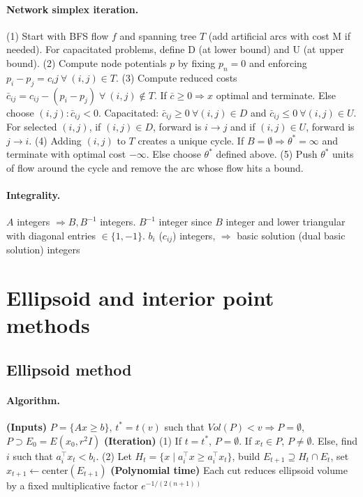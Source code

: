 \documentclass{article}
\begin{document}
\paragraph{Network simplex iteration.}
(1) Start with BFS flow $f$ and spanning tree $T$ (add artificial arcs with cost M if needed). For capacitated problems, define D (at lower bound) and U (at upper bound).
(2) Compute node potentials $p$ by fixing $p_n=0$ and enforcing $p_i - p_j = c_ij\ \forall\ (i,j)\in T$.
(3) Compute reduced costs $\bar c_{ij} = c_{ij} - (p_i - p_j)\;\forall\ (i,j)\notin T$. If $\bar c \geq 0 \Rightarrow x$ optimal and terminate. Else choose $(i,j): \bar c_{ij} < 0$. Capacitated: $\bar c_{ij} \geq 0\ \forall(i,j)\in D$ and $\bar c_{ij} \leq 0\ \forall(i,j)\in U$. For selected $(i,j)$, if $(i,j)\in D$, forward is $i\rightarrow j$ and if $(i,j)\in U$, forward is $j\rightarrow i$.
(4) Adding $(i,j)$ to $T$ creates a unique cycle. If $B=\emptyset\Longrightarrow \theta^*=\infty$ and terminate with optimal cost $-\infty$. Else choose $\theta^*$ defined above.
(5) Push $\theta^*$ units of flow around the cycle and remove the arc whose flow hits a bound.


\paragraph{Integrality.} $A$ integers $\Rightarrow B,B^{-1}$ integers. $B^{-1}$ integer since $B$ integer and lower triangular with diagonal entries $\in\{1, -1\}$. $b_i$ ($c_{ij}$) integers, $\Rightarrow$ basic solution (dual basic solution) integers


\section{Ellipsoid and interior point methods}
\subsection{Ellipsoid method}

\paragraph{Algorithm.} \textbf{(Inputs)} $P=\{Ax \geq b\}$, $t^*=t(v)$ such that $Vol(P) < v \Rightarrow P=\emptyset$, $P \supset E_0 = E(x_0, r^2I)$ \textbf{(Iteration)} (1) If $t=t^*$, $P=\emptyset$. If $x_t\in P$, $P\neq \emptyset$. Else, find $i$ such that $a_i^\top x_t  < b_i$. (2) Let $H_t = \{x \mid a_i^\top x \geq a_i^\top x_t\}$, build $E_{t+1} \supseteq H_t \cap E_t$, set $x_{t+1} \leftarrow \text{center}(E_{t+1})$ \textbf{(Polynomial time)} Each cut reduces ellipsoid volume by a fixed multiplicative factor $e^{-1/(2(n+1))}$
\end{document}
